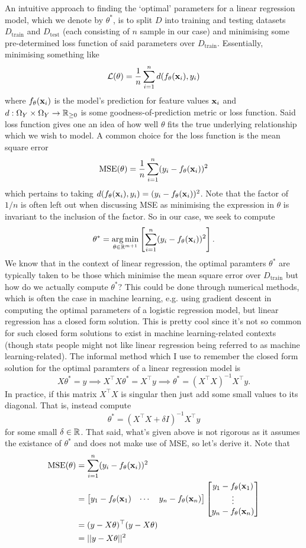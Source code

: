 \documentclass[11pt]{article}
\begin{document}
An intuitive approach to finding the `optimal' parameters for a linear regression model, which we denote by $\theta^{*}$, is to split $D$ into training and testing datasets $D_{\text{train}}$ and $D_{\text{test}}$ (each consisting of $n$ sample in our case) and minimising some pre-determined loss function of said parameters over $D_{\text{train}}$. Essentially, minimising something like
$$
\mathcal{L}(\theta)
=
\frac{1}{n}\sum_{i=1}^nd(f_{\theta}(\mathbf{x}_i), y_i)
$$
where $f_{\theta}(\mathbf{x}_i)$ is the model's prediction for feature values $\mathbf{x}_i$ and $d:\Omega_Y\times\Omega_Y\rightarrow\mathbb{R}_{\geq0}$ is some goodness-of-prediction metric or loss function. Said loss function gives one an idea of how well $\theta$ fits the true underlying relationship which we wish to model. A common choice for the loss function is the mean square error
$$
\text{MSE}(\theta)
=
\frac{1}{n}\sum_{i=1}^n(y_i-f_{\theta}(\mathbf{x}_i))^2
$$
which pertains to taking $d(f_{\theta}(\mathbf{x}_i), y_i)=(y_i-f_{\theta}(\mathbf{x}_i))^2$. Note that the factor of $1/n$ is often left out when discussing MSE as minimising the expression in $\theta$ is invariant to the inclusion of the factor. So in our case, we seek to compute
$$
\theta^{*}
=
\operatorname*{arg\,min}_{\theta\in\mathbb{R}^{m+1}}\left[\sum_{i=1}^n(y_i-f_{\theta}(\mathbf{x}_i))^2\right].
$$
We know that in the context of linear regression, the optimal paramters $\theta^{*}$ are typically taken to be those which minimise the mean square error over $D_{\text{train}}$ but how do we actually compute $\theta^{*}$? This could be done through numerical methods, which is often the case in machine learning, e.g. using gradient descent in computing the optimal parameters of a logistic regression model, but linear regression has a closed form solution. This is pretty cool since it's not so common for such closed form solutions to exist in machine learning-related contexts (though stats people might not like linear regression being referred to as machine learning-related). The informal method which I use to remember the closed form solution for the optimal paramters of a linear regression model is
$$
X\theta^{*}
=
y \implies X^{\top}X\theta^{*}=X^{\top}y \implies \theta^{*}=(X^{\top}X)^{-1}X^{\top}y.
$$
In practice, if this matrix $X^{\top}X$ is singular then just add some small values to its diagonal. That is, instead compute
$$
\theta^{*}
=
(X^{\top}X+\delta I)^{-1}X^{\top}y
$$
for some small $\delta\in\mathbb{R}$. That said, what's given above is not rigorous as it assumes the existance of $\theta^{*}$ and does not make use of MSE, so let's derive it. Note that
\begin{align*}
    \text{MSE}(\theta)
    &=
    \sum_{i=1}^n(y_i-f_{\theta}(\mathbf{x}_i))^2\\
    &=
    \begin{bmatrix}
        y_1-f_{\theta}(\mathbf{x}_1) & \cdots & y_n-f_{\theta}(\mathbf{x}_n)
    \end{bmatrix}
    \begin{bmatrix}
        y_1-f_{\theta}(\mathbf{x}_1)\\
        \vdots\\
        y_n-f_{\theta}(\mathbf{x}_n)
    \end{bmatrix}\\
    &=(y-X\theta)^{\top}(y-X\theta)\\
    &=||y-X\theta||^2
\end{align*}
\end{document}
